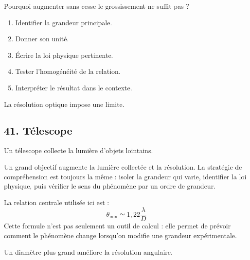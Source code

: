 \documentclass[11pt,a4paper]{article}
\begin{document}
\begin{exercicebox}
Pourquoi augmenter sans cesse le grossissement ne suffit pas ?
\begin{enumerate}
  \item Identifier la grandeur principale.
  \item Donner son unité.
  \item Écrire la loi physique pertinente.
  \item Tester l'homogénéité de la relation.
  \item Interpréter le résultat dans le contexte.
\end{enumerate}
\end{exercicebox}

\begin{corrigebox}[Indication]
La résolution optique impose une limite.
\end{corrigebox}


\subsection{41. Télescope}

\begin{exemplebox}
Un télescope collecte la lumière d'objets lointains.
\end{exemplebox}

\begin{methodebox}
Un grand objectif augmente la lumière collectée et la résolution.
La stratégie de compréhension est toujours la même : isoler la grandeur qui varie, identifier la loi physique, puis vérifier le sens du phénomène par un ordre de grandeur.
\end{methodebox}

\begin{theorembox}
La relation centrale utilisée ici est :
\[
\theta_{\min}\simeq1{,}22\frac{\lambda}{D}
\]
Cette formule n'est pas seulement un outil de calcul : elle permet de prévoir comment le phénomène change lorsqu'on modifie une grandeur expérimentale.
\end{theorembox}

\begin{odgbox}
Un diamètre plus grand améliore la résolution angulaire.
\end{odgbox}
\end{document}
